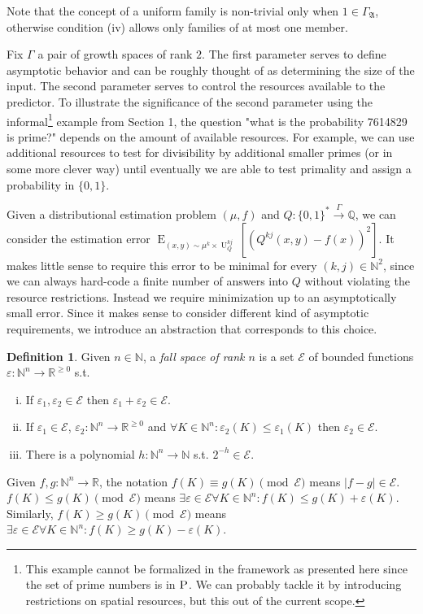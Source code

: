 \documentclass{article}
\numberwithin{equation}{section}
\theoremstyle{definition}
\newtheorem{definition}{Definition}[section]
\theoremstyle{plain}
\newcommand{\Bool}{\{0,1\}}
\newcommand{\Words}{{\Bool^*}}
\DeclareMathOperator{\E}{E}
\DeclareMathOperator{\U}{U}
\newcommand{\Nats}{\mathbb{N}}
\newcommand{\Rats}{\mathbb{Q}}
\newcommand{\Reals}{\mathbb{R}}
\newcommand{\Abs}[1]{\lvert #1 \rvert}
\newcommand{\GrowA}{\Gamma_{\mathfrak{A}}}
\newcommand{\Fall}{\mathcal{E}}
\newcommand{\Scheme}{\xrightarrow{\Gamma}}
\begin{document}
Note that the concept of a uniform family is non-trivial only when $1 \in \GrowA$, otherwise condition (iv) allows only families of at most one member.

Fix $\Gamma$ a pair of growth spaces of rank $2$. The first parameter serves to define asymptotic behavior and can be roughly thought of as determining the size of the input. The second parameter serves to control the resources available to the predictor. To illustrate the significance of the second parameter using the informal\footnote{This example cannot be formalized in the framework as presented here since the set of prime numbers is in $\textsc{P}$. We can probably tackle it by introducing restrictions on spatial resources, but this out of the current scope.} example from Section 1, the question "what is the probability 7614829 is prime?" depends on the amount of available resources. For example, we can use additional resources to test for divisibility by additional smaller primes (or in some more clever way) until eventually we are able to test primality and assign a probability in $\{0,1\}$.

Given a distributional estimation problem $(\mu,f)$ and $Q: \Words \Scheme \Rats$, we can consider the estimation error $\E_{(x,y) \sim \mu^k \times \U_Q^{kj}}[(Q^{kj}(x,y) - f(x))^2]$. It makes little sense to require this error to be minimal for every $(k,j) \in \Nats^2$, since we can always hard-code a finite number of answers into $Q$ without violating the resource restrictions. Instead we require minimization up to an asymptotically small error. Since it makes sense to consider different kind of asymptotic requirements, we introduce an abstraction that corresponds to this choice.

\begin{definition}

Given $n \in \Nats$, a \emph{fall space of rank $n$} is a set $\Fall$ of bounded functions $\varepsilon: \Nats^n \rightarrow \Reals^{\geq 0}$ s.t.

\begin{enumerate}[(i)]

\item If $\varepsilon_1, \varepsilon_2 \in \Fall$ then $\varepsilon_1 + \varepsilon_2 \in \Fall$.

\item If $\varepsilon_1 \in \Fall$, $\varepsilon_2: \Nats^n \rightarrow \Reals^{\geq 0}$ and $\forall K \in \Nats^n: \varepsilon_2(K) \leq \varepsilon_1(K)$ then $\varepsilon_2 \in \Fall$.

\item There is a polynomial $h: \Nats^n \rightarrow \Nats$ s.t. $2^{-h} \in \Fall$.

\end{enumerate}

Given $f,g: \Nats^n \rightarrow \Reals$, the notation $f(K) \equiv g(K) \pmod \Fall$ means $\Abs{f-g} \in \Fall$. $f(K) \leq g(K) \pmod \Fall$ means $\exists \varepsilon \in \Fall \forall K \in \Nats^n: f(K) \leq g(K) + \varepsilon(K)$. Similarly, $f(K) \geq g(K) \pmod \Fall$ means $\exists \varepsilon \in \Fall \forall K \in \Nats^n: f(K) \geq g(K) - \varepsilon(K)$.

\end{definition}
\end{document}
